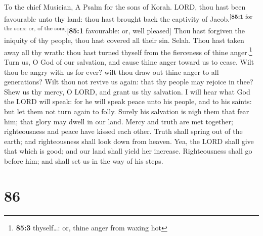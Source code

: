 To the chief Musician, A Psalm for the sons of Korah. 
LORD, thou hast been favourable unto thy land: thou hast brought back
the captivity of Jacob.\textsuperscript{{[}\textbf{85:1} for the sons:
or, of the sons{]}}{[}\textbf{85:1} favourable: or, well pleased{]}
 Thou hast forgiven the iniquity of thy people, thou hast
covered all their sin. Selah.  Thou hast taken away all
thy wrath: thou hast turned thyself from the fierceness of thine
anger.\footnote{\textbf{85:3} thyself\ldots: or, thine anger from waxing
  hot}  Turn us, O God of our salvation, and cause thine
anger toward us to cease.  Wilt thou be angry with us for
ever? wilt thou draw out thine anger to all generations? 
Wilt thou not revive us again: that thy people may rejoice in thee?
 Shew us thy mercy, O LORD, and grant us thy salvation.
 I will hear what God the LORD will speak: for he will
speak peace unto his people, and to his saints: but let them not turn
again to folly.  Surely his salvation is nigh them that
fear him; that glory may dwell in our land.  Mercy and
truth are met together; righteousness and peace have kissed each other.
 Truth shall spring out of the earth; and righteousness
shall look down from heaven.  Yea, the LORD shall give
that which is good; and our land shall yield her increase.
 Righteousness shall go before him; and shall set us in
the way of his steps.

\hypertarget{section-85}{%
\section{86}\label{section-85}}

